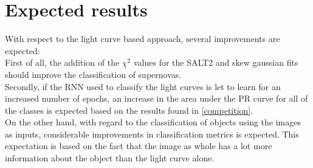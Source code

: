 \begin{table}[H]
  \end{table}

\section{Expected results}

With respect to the light curve based approach, several improvements are expected: \\

First of all, the addition of the $\chi^2$ values for the SALT2 and skew gaussian fits should improve the classification of supernovas. \\


Secondly, if the RNN used to classify the light curves is let to learn for an increased number of epochs, an increase in the area under the PR curve for all of the classes is expected based on the results found in \ref{competition}. \\

On the other hand, with regard to the classification of objects using the images as inputs, considerable improvements in classification metrics is expected. This expectation is based on the fact that the image as whole has a lot more information about the object than the light curve alone. 

\newpage
\printbibliography

